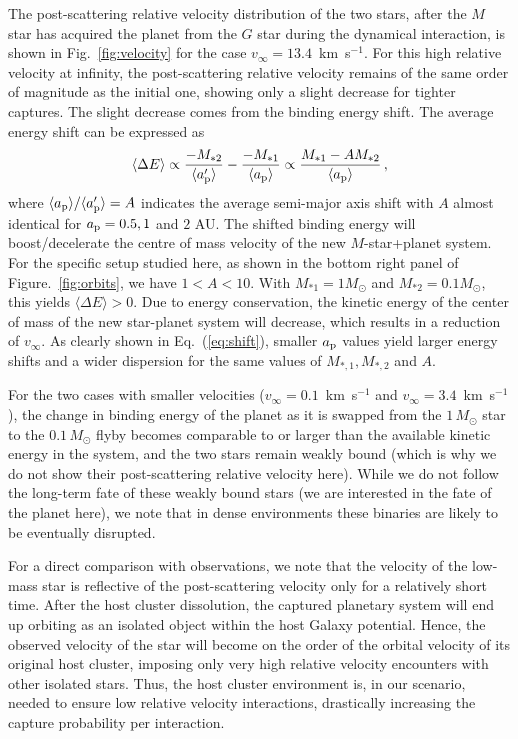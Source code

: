 \documentclass[twocolumn]{aastex62}
\begin{document}
The post-scattering relative velocity distribution of the two stars,  after the $M$ star has  acquired the planet from the $G$ star during the dynamical
interaction, is shown in Fig.~\ref{fig:velocity}
for the case $v_\infty=13.4$~km~s$^{-1}$. For this high relative velocity at infinity, the post-scattering relative velocity remains of the same order of magnitude as the initial one, showing only a slight decrease for tighter
captures.  The slight decrease comes from the binding energy shift. The average energy shift can be expressed as
\begin{equation}\label{eq:shift}
\langle \Delta E \rangle \propto \frac{-M_{*2}}{\langle a_{\rm p}^\prime \rangle} - \frac{-M_{*1}}{\langle a_{\rm p} \rangle }\propto \frac{M_{*1}-AM_{*2}}{\langle a_{\rm p} \rangle}\,,
\end{equation}
where $\langle a_{\rm p} \rangle /\langle a_{\rm p}^\prime \rangle =A$ indicates the average semi-major axis shift with $A$ almost identical for $a_{\rm p}=0.5,1$ and $2$ AU. The shifted binding energy will boost/decelerate the centre of mass velocity of the new $M$-star+planet system. For the specific setup studied here, as shown in the bottom right panel of Figure.~\ref{fig:orbits}, we have $1<A<10$. With $M_{*1}=1M_\odot$ and $M_{*2}=0.1M_\odot$, this yields $\langle \Delta E\rangle > 0$. Due to  energy conservation, the kinetic energy of the center of mass of the new star-planet system will decrease, which results in a reduction of $v_\infty$. As clearly shown in Eq.~(\ref{eq:shift}), smaller $a_{\rm p}$ values yield larger energy shifts and a wider dispersion for the same values of 
$M_{*,1}, M_{*,2}$ and
 $A$. 

For the two cases with smaller velocities  
($v_\infty=0.1$~km~s$^{-1}$ and $v_\infty=3.4$~km~s$^{-1}$), the change in binding energy of the planet as it is swapped from the $1\,M_\odot$ star to the $0.1\,M_\odot$ flyby becomes
comparable to or larger than the available kinetic energy in the system, and the two stars remain weakly bound (which is why we do not show their post-scattering relative velocity here). While we do not follow the long-term fate of these weakly bound stars (we are interested in the fate of the planet here), we note that in dense environments these binaries are likely to be eventually disrupted.

For a direct comparison with observations, we note that the velocity of the low-mass star is reflective of the post-scattering
velocity only for a relatively short time. After the host cluster dissolution, the captured planetary system will end up orbiting as an isolated object within the host Galaxy potential.  Hence, the observed velocity of the star will become on the order of the orbital velocity of its original host cluster, imposing only very high relative velocity encounters with other isolated stars.  Thus, the host cluster environment is, in our scenario, needed to ensure low relative velocity interactions, drastically increasing the capture probability per interaction. 
\end{document}
